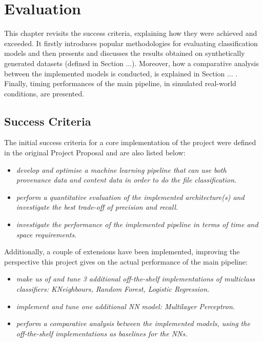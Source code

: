 

    \chapter{Evaluation}
    
    This chapter revisits the success criteria, explaining how they were achieved and exceeded. It firstly introduces popular methodologies for evaluating classification models and then presents and discusses the results obtained on synthetically generated datasets (defined in Section ...). Moreover, how a comparative analysis between the implemented models is conducted, is explained in Section ... . Finally, timing performances of the main pipeline, in simulated real-world conditions, are presented. \\
    
    \section{Success Criteria}
    
    The initial success criteria for a core implementation of the project were defined in the original Project Proposal and are also listed below: 
    
    \begin{itemize}
        \item \textit{develop and optimise a machine learning pipeline that can use both provenance data and content data in order to do the file classification}. \greencheck
        
        \item \textit{perform a quantitative evaluation of the implemented architecture(s) and investigate the best trade-off of precision and recall}. \greencheck
        
        \item \textit{investigate the performance of the implemented pipeline in terms of time and space requirements}. \greencheck
    
    \end{itemize}
        
    Additionally, a couple of extensions have been implemented, improving the perspective this project gives on the actual performance of the main pipeline: 
    
    \begin{itemize}
        \item \textit{make us of and tune 3 additional off-the-shelf implementations of multiclass classifiers: KNeighbours, Random Forest, Logistic Regression.} \greencheck
        
        \item \textit{implement and tune one additional NN model: Multilayer Perceptron.} \greencheck
        
        \item \textit{perform a comparative analysis between the implemented models, using the off-the-shelf implementations as baselines for the NNs.} \greencheck
    \end{itemize}
    
